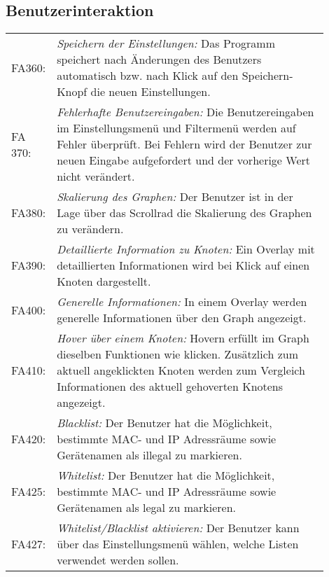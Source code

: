 \subsection{Benutzerinteraktion}

\begin{tabular}{lp{0.9\linewidth}}

FA360: & \textit{Speichern der Einstellungen: }Das Programm speichert nach Änderungen des Benutzers automatisch bzw. nach Klick auf den Speichern-Knopf die neuen Einstellungen. \\

FA 370: & \textit{Fehlerhafte Benutzereingaben: }Die Benutzereingaben im Einstellungsmenü und Filtermenü werden auf Fehler überprüft. Bei Fehlern wird der Benutzer zur neuen Eingabe aufgefordert und der vorherige Wert nicht verändert. \\

FA380: & \textit{Skalierung des Graphen: }Der Benutzer ist in der Lage über das Scrollrad die Skalierung des Graphen zu verändern. \\

FA390: & \textit{Detaillierte Information zu Knoten: }Ein Overlay mit detaillierten Informationen wird bei Klick auf einen Knoten dargestellt. \\

FA400: & \textit{Generelle Informationen: }In einem Overlay werden generelle Informationen über den Graph angezeigt. \\

FA410: & \textit{Hover über einem Knoten: }Hovern erfüllt im Graph dieselben Funktionen wie klicken. Zusätzlich zum aktuell angeklickten Knoten werden zum Vergleich Informationen des aktuell gehoverten Knotens angezeigt. \\

FA420: & \textit{Blacklist: }Der Benutzer hat die Möglichkeit, bestimmte MAC- und IP Adressräume sowie Gerätenamen als illegal zu markieren. \\

FA425: & \textit{Whitelist: }Der Benutzer hat die Möglichkeit, bestimmte MAC- und IP Adressräume sowie Gerätenamen als legal zu markieren. \\

FA427: & \textit{Whitelist/Blacklist aktivieren: }Der Benutzer kann über das Einstellungsmenü wählen, welche Listen verwendet werden sollen. \\

\end{tabular}

